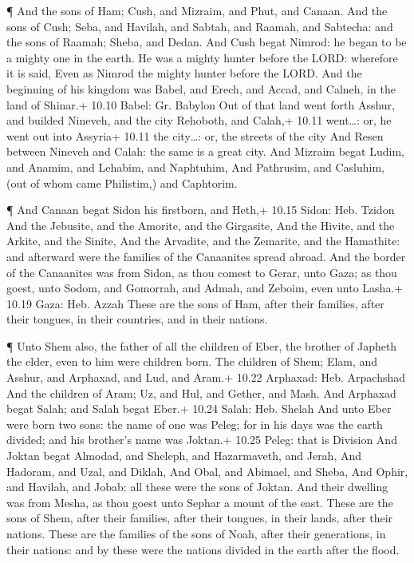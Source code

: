  ¶ And the sons of Ham; Cush, and Mizraim, and Phut, and
Canaan.  And the sons of Cush; Seba, and Havilah, and
Sabtah, and Raamah, and Sabtecha: and the sons of Raamah; Sheba, and
Dedan.  And Cush begat Nimrod: he began to be a mighty one
in the earth.  He was a mighty hunter before the LORD:
wherefore it is said, Even as Nimrod the mighty hunter before the LORD.
 And the beginning of his kingdom was Babel, and Erech, and
Accad, and Calneh, in the land of Shinar.+ 10.10 Babel: Gr. Babylon
 Out of that land went forth Asshur, and builded Nineveh,
and the city Rehoboth, and Calah,+ 10.11 went\ldots: or, he went out
into Assyria+ 10.11 the city\ldots: or, the streets of the city
 And Resen between Nineveh and Calah: the same is a great
city.  And Mizraim begat Ludim, and Anamim, and Lehabim,
and Naphtuhim,  And Pathrusim, and Casluhim, (out of whom
came Philistim,) and Caphtorim.

 ¶ And Canaan begat Sidon his firstborn, and Heth,+ 10.15
Sidon: Heb. Tzidon  And the Jebusite, and the Amorite, and
the Girgasite,  And the Hivite, and the Arkite, and the
Sinite,  And the Arvadite, and the Zemarite, and the
Hamathite: and afterward were the families of the Canaanites spread
abroad.  And the border of the Canaanites was from Sidon,
as thou comest to Gerar, unto Gaza; as thou goest, unto Sodom, and
Gomorrah, and Admah, and Zeboim, even unto Lasha.+ 10.19 Gaza: Heb.
Azzah  These are the sons of Ham, after their families,
after their tongues, in their countries, and in their nations.

 ¶ Unto Shem also, the father of all the children of Eber,
the brother of Japheth the elder, even to him were children born.
 The children of Shem; Elam, and Asshur, and Arphaxad, and
Lud, and Aram.+ 10.22 Arphaxad: Heb. Arpachshad  And the
children of Aram; Uz, and Hul, and Gether, and Mash.  And
Arphaxad begat Salah; and Salah begat Eber.+ 10.24 Salah: Heb. Shelah
 And unto Eber were born two sons: the name of one was
Peleg; for in his days was the earth divided; and his brother's name was
Joktan.+ 10.25 Peleg: that is Division  And Joktan begat
Almodad, and Sheleph, and Hazarmaveth, and Jerah,  And
Hadoram, and Uzal, and Diklah,  And Obal, and Abimael, and
Sheba,  And Ophir, and Havilah, and Jobab: all these were
the sons of Joktan.  And their dwelling was from Mesha, as
thou goest unto Sephar a mount of the east.  These are the
sons of Shem, after their families, after their tongues, in their lands,
after their nations.  These are the families of the sons of
Noah, after their generations, in their nations: and by these were the
nations divided in the earth after the flood.

